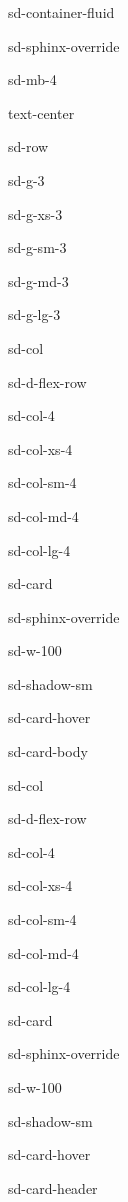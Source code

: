 \documentclass[letterpaper,10pt,english]{jupyterBook}
\begin{document}
\begin{sphinxuseclass}{sd-container-fluid}
\begin{sphinxuseclass}{sd-sphinx-override}
\begin{sphinxuseclass}{sd-mb-4}
\begin{sphinxuseclass}{text-center}
\begin{sphinxuseclass}{sd-row}
\begin{sphinxuseclass}{sd-g-3}
\begin{sphinxuseclass}{sd-g-xs-3}
\begin{sphinxuseclass}{sd-g-sm-3}
\begin{sphinxuseclass}{sd-g-md-3}
\begin{sphinxuseclass}{sd-g-lg-3}
\begin{sphinxuseclass}{sd-col}
\begin{sphinxuseclass}{sd-d-flex-row}
\begin{sphinxuseclass}{sd-col-4}
\begin{sphinxuseclass}{sd-col-xs-4}
\begin{sphinxuseclass}{sd-col-sm-4}
\begin{sphinxuseclass}{sd-col-md-4}
\begin{sphinxuseclass}{sd-col-lg-4}
\begin{sphinxuseclass}{sd-card}
\begin{sphinxuseclass}{sd-sphinx-override}
\begin{sphinxuseclass}{sd-w-100}
\begin{sphinxuseclass}{sd-shadow-sm}
\begin{sphinxuseclass}{sd-card-hover}
\begin{sphinxuseclass}{sd-card-body}
\begin{figure}[htbp]
\noindent{}
\end{figure}

\end{sphinxuseclass}{\hyperref[\detokenize{6_Direct_methods/6.0_Direct_methods::doc}]{}}
\end{sphinxuseclass}
\end{sphinxuseclass}
\end{sphinxuseclass}
\end{sphinxuseclass}
\end{sphinxuseclass}
\end{sphinxuseclass}
\end{sphinxuseclass}
\end{sphinxuseclass}
\end{sphinxuseclass}
\end{sphinxuseclass}
\end{sphinxuseclass}
\end{sphinxuseclass}
\begin{sphinxuseclass}{sd-col}
\begin{sphinxuseclass}{sd-d-flex-row}
\begin{sphinxuseclass}{sd-col-4}
\begin{sphinxuseclass}{sd-col-xs-4}
\begin{sphinxuseclass}{sd-col-sm-4}
\begin{sphinxuseclass}{sd-col-md-4}
\begin{sphinxuseclass}{sd-col-lg-4}
\begin{sphinxuseclass}{sd-card}
\begin{sphinxuseclass}{sd-sphinx-override}
\begin{sphinxuseclass}{sd-w-100}
\begin{sphinxuseclass}{sd-shadow-sm}
\begin{sphinxuseclass}{sd-card-hover}
\begin{sphinxuseclass}{sd-card-header}

\end{sphinxuseclass}
\end{sphinxuseclass}
\end{sphinxuseclass}
\end{sphinxuseclass}
\end{sphinxuseclass}
\end{sphinxuseclass}
\end{sphinxuseclass}
\end{sphinxuseclass}
\end{sphinxuseclass}
\end{sphinxuseclass}
\end{sphinxuseclass}
\end{sphinxuseclass}
\end{sphinxuseclass}
\end{sphinxuseclass}
\end{sphinxuseclass}
\end{sphinxuseclass}
\end{sphinxuseclass}
\end{sphinxuseclass}
\end{sphinxuseclass}
\end{sphinxuseclass}
\end{sphinxuseclass}
\end{sphinxuseclass}
\end{sphinxuseclass}
\end{document}
